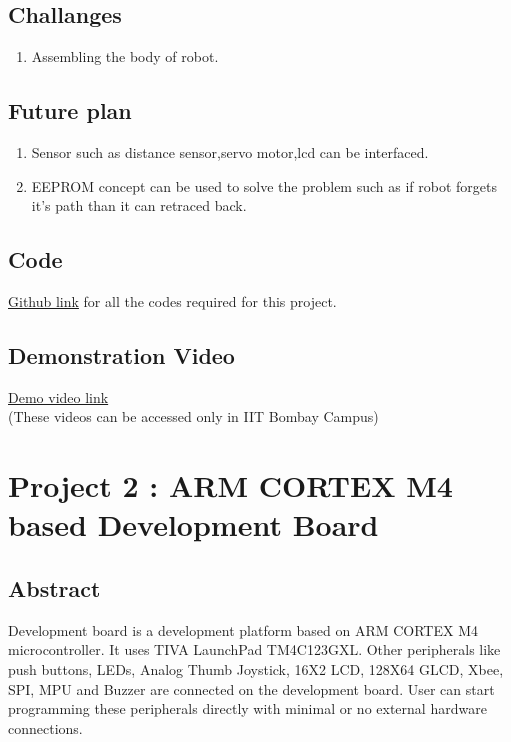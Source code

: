 \documentclass[a4paper,12pt,oneside]{book}
\begin{document}
\section{Challanges}
\begin{enumerate}
\item Assembling the body of robot.
\end{enumerate}
\section{Future plan}
\begin{enumerate}
\item  Sensor such as distance sensor,servo motor,lcd can be interfaced.
\item EEPROM concept can be used to solve the problem such as if robot forgets it's path than it can retraced back.
\end{enumerate}
\section{Code}
\href{https://https://github.com/eYSIP-2016/eYSIP-2016-Around-the-world-of-Embedded-Systems/blob/origin/master/Solutions/Linefollower/linefollower.c}{Github link} for all the codes required for this project.

\section{Demonstration Video}

\href{http://10.129.139.139/videos/Project-Line_Follower.html}{Demo video link} \\
(These videos can be accessed only in IIT Bombay Campus)







\chapter[Project Tag]{ Project 2 : ARM CORTEX M4 based Development Board}
\section*{Abstract}
Development board is a development platform based on ARM CORTEX M4 microcontroller. It uses TIVA LaunchPad TM4C123GXL. Other peripherals like push buttons, LEDs, Analog Thumb Joystick, 16X2 LCD, 128X64 GLCD, Xbee, SPI, MPU and Buzzer are connected on the development board. User can start programming these peripherals directly with minimal or no external hardware connections.  
\end{document}
